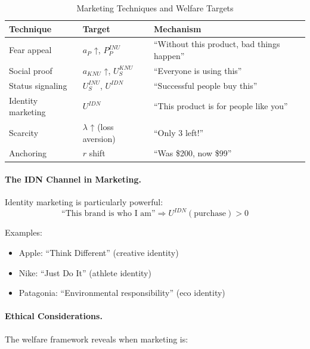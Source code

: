 \begin{table}[htbp]
\centering
\caption{Marketing Techniques and Welfare Targets}
\label{tab:marketing-techniques}
\renewcommand{\arraystretch}{1.3}
\begin{tabular}{@{}lll@{}}
\toprule
\textbf{Technique} & \textbf{Target} & \textbf{Mechanism} \\
\midrule
Fear appeal & $a_{P}$ ↑, $P^{INU}_P$ & ``Without this product, bad things happen'' \\
Social proof & $a_{KNU}$ ↑, $U^{KNU}_S$ & ``Everyone is using this'' \\
Status signaling & $U^{INU}_S$, $U^{IDN}$ & ``Successful people buy this'' \\
Identity marketing & $U^{IDN}$ & ``This product is for people like you'' \\
Scarcity & $\lambda$ ↑ (loss aversion) & ``Only 3 left!'' \\
Anchoring & $r$ shift & ``Was \$200, now \$99'' \\
\bottomrule
\end{tabular}
\end{table}

\paragraph{The IDN Channel in Marketing.}
Identity marketing is particularly powerful:
\begin{equation}
\text{``This brand is who I am''} \Rightarrow U^{IDN}(\text{purchase}) > 0
\end{equation}

Examples:
\begin{itemize}
\item Apple: ``Think Different'' (creative identity)
\item Nike: ``Just Do It'' (athlete identity)
\item Patagonia: ``Environmental responsibility'' (eco identity)
\end{itemize}

\paragraph{Ethical Considerations.}
The welfare framework reveals when marketing is:

